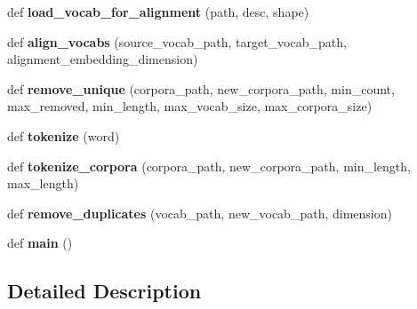 \begin{DoxyCompactItemize}
\item 
def {\bfseries load\+\_\+vocab\+\_\+for\+\_\+alignment} (path, desc, shape)\hypertarget{namespacegenerate_aa92835401cb07a35e8537a2abab42cec}{}\label{namespacegenerate_aa92835401cb07a35e8537a2abab42cec}

\item 
def {\bfseries align\+\_\+vocabs} (source\+\_\+vocab\+\_\+path, target\+\_\+vocab\+\_\+path, alignment\+\_\+embedding\+\_\+dimension)\hypertarget{namespacegenerate_a03bfc976c1f2ffaab6e49bd149b2fc43}{}\label{namespacegenerate_a03bfc976c1f2ffaab6e49bd149b2fc43}

\item 
def {\bfseries remove\+\_\+unique} (corpora\+\_\+path, new\+\_\+corpora\+\_\+path, min\+\_\+count, max\+\_\+removed, min\+\_\+length, max\+\_\+vocab\+\_\+size, max\+\_\+corpora\+\_\+size)\hypertarget{namespacegenerate_aca9a2281e383a78a32df12780242f3f3}{}\label{namespacegenerate_aca9a2281e383a78a32df12780242f3f3}

\item 
def {\bfseries tokenize} (word)\hypertarget{namespacegenerate_abb147de81efbf57192b486010a42b5ce}{}\label{namespacegenerate_abb147de81efbf57192b486010a42b5ce}

\item 
def {\bfseries tokenize\+\_\+corpora} (corpora\+\_\+path, new\+\_\+corpora\+\_\+path, min\+\_\+length, max\+\_\+length)\hypertarget{namespacegenerate_a8fc2ea106b2e78fdfcd6ff84fdcbf38b}{}\label{namespacegenerate_a8fc2ea106b2e78fdfcd6ff84fdcbf38b}

\item 
def {\bfseries remove\+\_\+duplicates} (vocab\+\_\+path, new\+\_\+vocab\+\_\+path, dimension)\hypertarget{namespacegenerate_ac4a96d033fec5c62c774d902e559adca}{}\label{namespacegenerate_ac4a96d033fec5c62c774d902e559adca}

\item 
def {\bfseries main} ()\hypertarget{namespacegenerate_a7f0253880883fcd9badd715587a15668}{}\label{namespacegenerate_a7f0253880883fcd9badd715587a15668}

\end{DoxyCompactItemize}


\subsection{Detailed Description}
\begin{DoxyVerb}\end{DoxyVerb}
 